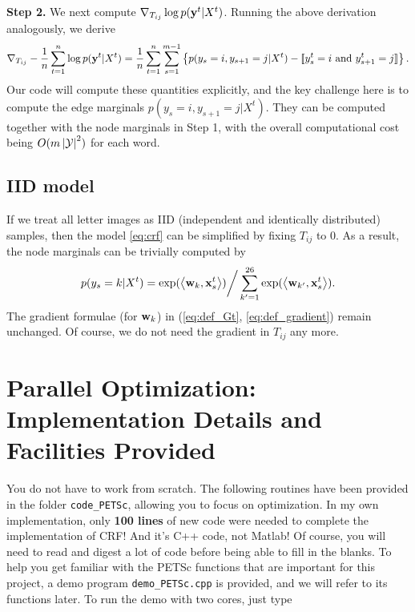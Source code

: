 \documentclass[11pt]{report}
\begin{document}
{\bf Step 2.} We next compute ${\nabla}_{T_{ij}} \log p(\mathbf{\boldsymbol{y}}^t|X^t)$.
Running the above derivation analogously, we derive
\begin{align}
\label{eq:grad_edge_weight}
  {\nabla}_{T_{ij}} -\frac{1}{n} \sum_{t=1}^n \log p(\mathbf{\boldsymbol{y}}^t | X^t) = \frac{1}{n} \sum_{t=1}^n \sum_{s=1}^{m-1} \left\{p(y_s=i, y_{s+1} = j | X^t) - [\![y^t_s = i \text{ and } y^t_{s+1} = j]\!] \right\}.
\end{align}
%
Our code will compute these quantities explicitly, and the key challenge here is to compute the edge marginals $p(y_s=i, y_{s+1} = j | X^t)$.
They can be computed together with the node marginals in Step 1,
with the overall computational cost being $O(m \left|\mathcal{Y}\right|^2)$ for each word.

\subsection{IID model}

If we treat all letter images as IID (independent and identically distributed) samples,
then the model \eqref{eq:crf} can be simplified by fixing $T_{ij}$ to 0.
As a result, the node marginals can be trivially computed by
\begin{align}
  p(y_s = k | X^t) = \exp(\left\langle \mathbf{\boldsymbol{w}}_k,\mathbf{\boldsymbol{x}}^t_s \right\rangle) \bigg/ \sum_{k' = 1}^{26} \exp(\left\langle \mathbf{\boldsymbol{w}}_{k'},\mathbf{\boldsymbol{x}}^t_s \right\rangle).
\end{align}
%
The gradient formulae (for $\mathbf{\boldsymbol{w}}_k$) in (\ref{eq:def_Gt}, \ref{eq:def_gradient}) remain unchanged.
Of course, we do not need the gradient in $T_{ij}$ any more.


\section{Parallel Optimization: Implementation Details and Facilities Provided}
\label{sec:parallel_detail}

You do not have to work from scratch.
The following routines have been provided in the folder \verb!code_PETSc!,
allowing you to focus on optimization.
In my own implementation, only {\bf 100 lines} of new code were needed to complete the implementation of CRF!
And it's C++ code, not Matlab!
Of course, you will need to read and digest a lot of code before being able to fill in the blanks.
To help you get familiar with the PETSc functions that are important for this project,
a demo program \verb!demo_PETSc.cpp! is provided, and we will refer to its functions later.
To run the demo with two cores, just type
\end{document}
